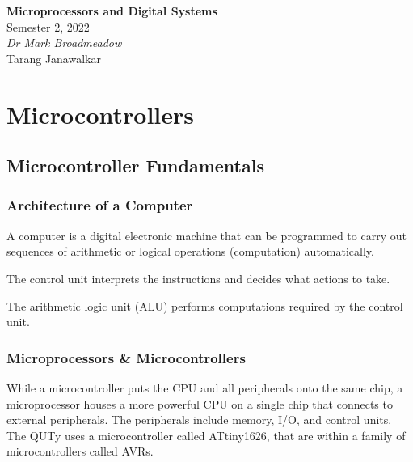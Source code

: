 \documentclass{report}
\date{}
\newcommand{\unitName}{Microprocessors and Digital Systems}
\newcommand{\unitTime}{Semester 2, 2022}
\newcommand{\unitCoordinator}{Dr Mark Broadmeadow}
\newcommand{\documentAuthors}{Tarang Janawalkar}
\begin{document}
%
\begin{titlepage}
    \vspace*{\fill}
    \begin{center}
        \LARGE{\textbf{\unitName}} \\[0.1in]
        \normalsize{\unitTime} \\[0.2in]
        \normalsize\textit{\unitCoordinator} \\[0.2in]
        \documentAuthors
    \end{center}
    \vspace*{\fill}
    \doclicenseThis
    \thispagestyle{empty}
\end{titlepage}
\newpage
%
\tableofcontents
\newpage
%
\part{Microcontrollers}
\chapter{Microcontroller Fundamentals}
\section{Architecture of a Computer}
\begin{definition}[Computer]
    A computer is a digital electronic machine that can be programmed to carry
    out sequences of arithmetic or logical operations (computation) automatically.
\end{definition}
\begin{definition}
    The control unit interprets the instructions and decides what actions to take.
\end{definition}
\begin{definition}
    The arithmetic logic unit (ALU) performs computations required by the control unit.
\end{definition}
\section{Microprocessors \& Microcontrollers}
While a microcontroller puts the CPU and all peripherals onto the same chip,
a microprocessor houses a more powerful CPU on a single chip that connects to external peripherals.
The peripherals include memory, I/O, and control units.
The QUTy uses a microcontroller called ATtiny1626, that are within a family of microcontrollers called AVRs.
\end{document}
